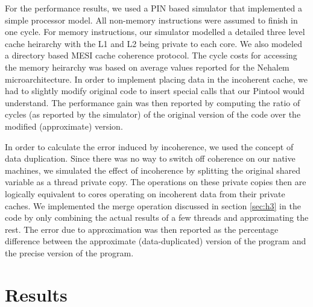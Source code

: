 \documentclass[12pt,conference]{IEEEtran}
\begin{document}

For the performance results, we used a PIN based simulator that
implemented a simple processor model. All non-memory instructions were assumed to
finish in one cycle. For memory instructions, our simulator modelled a detailed
three level cache heirarchy with the L1 and L2 being private to each core. We also 
modeled a directory based MESI cache coherence protocol. The cycle costs for 
accessing the memory heirarchy was based on average values reported for the 
Nehalem microarchitecture. In order to implement placing data in the incoherent cache, 
we had to slightly modify original code to insert special calls that our Pintool would
understand. The performance gain was then reported by computing the ratio of cycles (as
reported by the simulator) of the original version of the code over the modified (approximate) version. 

In order to calculate the error induced by incoherence, we used the concept of 
data duplication. Since there was no way to switch off coherence on our native machines, we
simulated the effect of incoherence by splitting the original shared variable as a thread
private copy. The operations on these private copies then are logically equivalent to cores
operating on incoherent data from their private caches. We implemented the merge operation discussed in 
section \ref{sec:h3} in the code by only combining the actual results of a 
few threads and approximating the rest. The error due to approximation was then 
reported as the percentage difference between the approximate (data-duplicated) version of the 
program and the precise version of the program. 

\section{Results}
\end{document}
